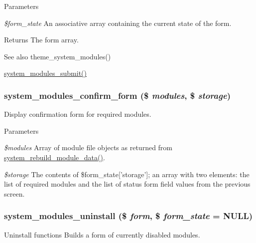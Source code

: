 \begin{DoxyParams}{Parameters}
\item[{\em \$form\_\-state}]An associative array containing the current state of the form.\end{DoxyParams}
\begin{DoxyReturn}{Returns}
The form array.
\end{DoxyReturn}
\begin{DoxySeeAlso}{See also}
theme\_\-system\_\-modules() 

\hyperlink{system_8admin_8inc_ab5e3e0148d76ec1bfe7e441d4ff56146}{system\_\-modules\_\-submit()} 
\end{DoxySeeAlso}
\hypertarget{group__forms_ga253f61674ab19c32b0df811c365ae00c}{
\subsubsection[{system\_\-modules\_\-confirm\_\-form}]{\setlength{\rightskip}{0pt plus 5cm}system\_\-modules\_\-confirm\_\-form (\$ {\em modules}, \/  \$ {\em storage})}}
\label{group__forms_ga253f61674ab19c32b0df811c365ae00c}
Display confirmation form for required modules.


\begin{DoxyParams}{Parameters}
\item[{\em \$modules}]Array of module file objects as returned from \hyperlink{system_8module_a2c3c848bc7c14d6f770a2f8df8f35332}{system\_\-rebuild\_\-module\_\-data()}. \item[{\em \$storage}]The contents of \$form\_\-state\mbox{[}'storage'\mbox{]}; an array with two elements: the list of required modules and the list of status form field values from the previous screen. \end{DoxyParams}
\hypertarget{group__forms_gadb3d128adf18e3ff4e23ada8271b24c8}{
\subsubsection[{system\_\-modules\_\-uninstall}]{\setlength{\rightskip}{0pt plus 5cm}system\_\-modules\_\-uninstall (\$ {\em form}, \/  \$ {\em form\_\-state} = {\ttfamily NULL})}}
\label{group__forms_gadb3d128adf18e3ff4e23ada8271b24c8}
Uninstall functions Builds a form of currently disabled modules.

